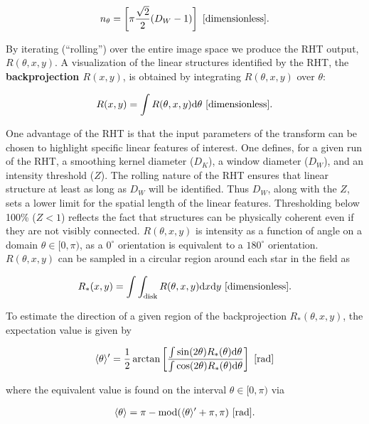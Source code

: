 \documentclass[a4paper,10pt]{article}
\begin{document}
\begin{align*}
    n_\theta = \left[\pi\frac{\sqrt{2}}{2}(D_W-1)\right] ~ [{\rm dimensionless}].
\end{align*}

{\noindent}By iterating (``rolling'') over the entire image space we produce the RHT output, $R(\theta,x,y)$. A visualization of the linear structures identified by the RHT, the \textbf{backprojection $R(x,y)$}, is obtained by integrating $R(\theta,x,y)$ over $\theta$:

\begin{align*}
    R(x,y) = \int R(\theta,x,y)\mathrm{d}\theta ~ [{\rm dimensionless}].
\end{align*}

{\noindent}One advantage of the RHT is that the input parameters of the transform can be chosen to highlight specific linear features of interest. One defines, for a given run of the RHT, a smoothing kernel diameter ($D_K$), a window diameter ($D_W$), and an intensity threshold ($Z$). The rolling nature of the RHT ensures that linear structure at least as long as $D_W$ will be identified. Thus $D_W$, along with the $Z$, sets a lower limit for the spatial length of the linear features. Thresholding below 100\% ($Z<1$) reflects the fact that structures can be physically coherent even if they are not visibly connected. $R(\theta,x,y)$ is intensity as a function of angle on a domain $\theta\in[0,\pi)$, as a $0^\circ$ orientation is equivalent to a $180^\circ$ orientation. $R(\theta,x,y)$ can be sampled in a circular region around each star in the field as

\begin{align*}
    R_*(x,y) = \int\int_\mathrm{disk} R(\theta,x,y)\mathrm{d}x\mathrm{d}y ~ [{\rm dimensionless}].
\end{align*}

{\noindent}To estimate the direction of a given region of the backprojection $R_*(\theta,x,y)$, the expectation value is given by

\begin{align*}
    \langle\theta\rangle' = \frac{1}{2}\arctan \left[\frac{\int\sin(2\theta)R_*(\theta)\mathrm{d}\theta}{\int\cos(2\theta)R_*(\theta)\mathrm{d}\theta}\right] ~ [{\rm rad}]
\end{align*}

{\noindent}where the equivalent value is found on the interval $\theta\in[0,\pi)$ via

\begin{align*}
    \langle\theta\rangle = \pi - {\rm mod}(\langle\theta\rangle'+\pi,\pi) ~ [{\rm rad}].
\end{align*}
\end{document}
